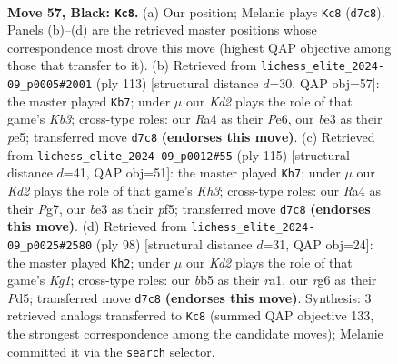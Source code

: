 \documentclass[11pt]{article}
\begin{document}
\clearpage

\begin{figure}[p]\centering
\begin{subfigure}{0.46\textwidth}\centering
\resizebox{\linewidth}{!}{%
\newchessgame
\chessboard[
  setfen={8/p1pk4/5nR1/1B3p2/r4P2/4B3/2K4P/8 b - - 1 57},
  showmover=false,
  pgfstyle=straightmove, color=movearrow, markmove={d7-c8}
]}
\caption{}
\end{subfigure}\hfill
\begin{subfigure}{0.46\textwidth}\centering
\resizebox{\linewidth}{!}{%
\newchessgame
\chessboard[
  setfen={8/2p5/1k2p3/1P2P1P1/2K2nr1/4B3/2p5/2R5 b - - 1 57},
  showmover=false,
  pgfstyle=straightmove, color=movearrow, markmove={b6-b7}
]}
\caption{}
\end{subfigure}
\\[4pt]
\begin{subfigure}{0.46\textwidth}\centering
\resizebox{\linewidth}{!}{%
\newchessgame
\chessboard[
  setfen={8/2R3p1/6pk/5P2/3P3r/1P1KB3/8/8 b - - 0 58},
  showmover=false,
  pgfstyle=straightmove, color=movearrow, markmove={h6-h7}
]}
\caption{}
\end{subfigure}\hfill
\begin{subfigure}{0.46\textwidth}\centering
\resizebox{\linewidth}{!}{%
\newchessgame
\chessboard[
  setfen={8/3k4/4R1P1/3P1N2/4p1P1/5b2/5P2/r5K1 w - - 1 50},
  showmover=false,
  pgfstyle=straightmove, color=movearrow, markmove={g1-h2}
]}
\caption{}
\end{subfigure}
\caption{\textbf{Move 57, Black: \texttt{Kc8}.} (a) Our position; Melanie plays \texttt{Kc8} (\texttt{d7c8}). Panels (b)--(d) are the retrieved master positions whose correspondence most drove this move (highest QAP objective among those that transfer to it). (b) Retrieved from \texttt{lichess\_elite\_2024-09\_p0005\#2001} (ply 113) [structural distance $d$=30, QAP obj=57]: the master played \texttt{Kb7}; under $\mu$ our \emph{Kd2} plays the role of that game's \emph{Kb3}; cross-type roles: our \emph{R}a4 as their \emph{P}e6, our \emph{b}e3 as their \emph{p}e5; transferred move \texttt{d7c8} \textbf{(endorses this move)}. (c) Retrieved from \texttt{lichess\_elite\_2024-09\_p0012\#55} (ply 115) [structural distance $d$=41, QAP obj=51]: the master played \texttt{Kh7}; under $\mu$ our \emph{Kd2} plays the role of that game's \emph{Kh3}; cross-type roles: our \emph{R}a4 as their \emph{P}g7, our \emph{b}e3 as their \emph{p}f5; transferred move \texttt{d7c8} \textbf{(endorses this move)}. (d) Retrieved from \texttt{lichess\_elite\_2024-09\_p0025\#2580} (ply 98) [structural distance $d$=31, QAP obj=24]: the master played \texttt{Kh2}; under $\mu$ our \emph{Kd2} plays the role of that game's \emph{Kg1}; cross-type roles: our \emph{b}b5 as their \emph{r}a1, our \emph{r}g6 as their \emph{P}d5; transferred move \texttt{d7c8} \textbf{(endorses this move)}. Synthesis: 3 retrieved analogs transferred to \texttt{Kc8} (summed QAP objective 133, the strongest correspondence among the candidate moves); Melanie committed it via the \texttt{search} selector.}
\label{fig:thought-m113}
\end{figure}
\end{document}
